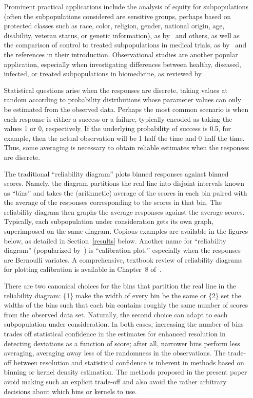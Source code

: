 \documentclass{article}
\begin{document}
Prominent practical applications include the analysis of equity
for subpopulations (often the subpopulations considered are sensitive groups,
perhaps based on protected classes such as race, color, religion, gender,
national origin, age, disability, veteran status, or genetic information),
as by~\cite{corbett-davies-pierson-feller-goel-huq} and others,
as well as the comparison of control to treated subpopulations
in medical trials, as by~\cite{xu-kalbfleisch} and the references
in their introduction. Observational studies are another popular application,
especially when investigating differences between healthy, diseased, infected,
or treated subpopulations in biomedicine,
as reviewed by~\cite{luo-gardiner-bradley}.

Statistical questions arise when the responses are discrete,
taking values at random according to probability distributions
whose parameter values can only be estimated from the observed data.
Perhaps the most common scenario is when each response is either a success
or a failure, typically encoded as taking the values 1 or 0, respectively.
If the underlying probability of success is 0.5, for example,
then the actual observation will be 1 half the time and 0 half the time.
Thus, some averaging is necessary to obtain reliable estimates
when the responses are discrete.

The traditional ``reliability diagram'' plots binned responses
against binned scores. Namely, the diagram partitions the real line
into disjoint intervals known as ``bins'' and takes the (arithmetic) average
of the scores in each bin paired with the average
of the responses corresponding to the scores in that bin.
The reliability diagram then graphs the average responses
against the average scores.
Typically, each subpopulation under consideration gets its own graph,
superimposed on the same diagram.
Copious examples are available in the figures below,
as detailed in Section~\ref{results} below.
Another name for ``reliability diagram''
(popularized by~\cite{corbett-davies-pierson-feller-goel-huq})
is ``calibration plot,'' especially when the responses are Bernoulli variates.
A comprehensive, textbook review of reliability diagrams
for plotting calibration is available in Chapter~8 of~\cite{wilks}.

There are two canonical choices for the bins that partition the real line
in the reliability diagram: \{1\} make the width of every bin be the same
or \{2\} set the widths of the bins such that each bin contains
roughly the same number of scores from the observed data set.
Naturally, the second choice can adapt to each subpopulation
under consideration. In both cases, increasing the number of bins
trades off statistical confidence in the estimates
for enhanced resolution in detecting deviations as a function of score;
after all, narrower bins perform less averaging, averaging away less
of the randomness in the observations.
The trade-off between resolution and statistical confidence
is inherent in methods based on binning or kernel density estimation.
The methods proposed in the present paper avoid making
such an explicit trade-off and also avoid the rather arbitrary decisions
about which bins or kernels to use.
\end{document}
